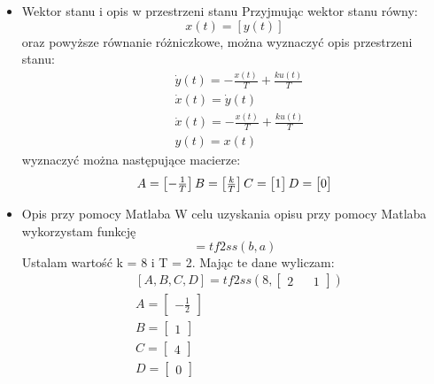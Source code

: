 \documentclass[a4paper,10pt]{article}
\begin{document}
\begin{itemize}
\begin{itemize}
\item Wektor stanu i opis w przestrzeni stanu
\newline Przyjmując wektor stanu równy: \[ x(t) = [y(t)] \]
oraz powyższe równanie różniczkowe, można wyznaczyć opis przestrzeni stanu:
\begin{equation}
\begin{split}
&\dot{y}(t) = -\frac{x(t)}{T} + \frac{k u(t)}{T}\\
&\dot{x}(t) = \dot{y}(t)\\
&\dot{x}(t) = -\frac{x(t)}{T} + \frac{k u(t)}{T}\\
&y(t) = x(t)
\end{split}
\end{equation}
wyznaczyć można następujące macierze:
\begin{equation}
A =
\begin{bmatrix}
-\frac{1}{T}
\end{bmatrix}\\
B =
\begin{bmatrix}
\frac{k}{T}
\end{bmatrix}\\
C =
\begin{bmatrix}
1
\end{bmatrix}\\
D =
\begin{bmatrix}
0
\end{bmatrix}
\end{equation}
\item Opis przy pomocy Matlaba
\newline W celu uzyskania opisu przy pomocy Matlaba wykorzystam funkcję
\begin{equation}
[A,B,C,D]
= tf2ss(b,a)
\end{equation}
Ustalam wartość k = 8 i T = 2.
Mając te dane wyliczam:
\begin{equation}
\begin{split}
&[A, B, C, D]
= tf2ss(8, \begin{bmatrix}
2 && 1
\end{bmatrix})\\
&A =
\begin{bmatrix}
-\frac{1}{2}
\end{bmatrix}\\
&B =
\begin{bmatrix}
1
\end{bmatrix}\\
&C =
\begin{bmatrix}
4
\end{bmatrix}\\
&D =
\begin{bmatrix}
0
\end{bmatrix}
\end{split}
\end{equation}


\end{itemize}
\end{itemize}
\end{document}
